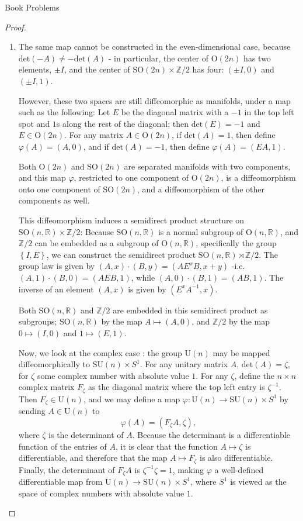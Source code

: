 \documentclass[12pt]{article}
\newcommand{\Z}{\mathbb{Z}}
\newcommand{\R}{\mathbb{R}}
\theoremstyle{definition}
\begin{document}
\begin{section}{Book Problems}
\begin{proof}
\begin{enumerate}[label=(\roman*)]
		\item The same map cannot be constructed in the even-dimensional case, because $\text{det}(-A) \neq -\text{det}(A)$ - in particular, the center of $\text{O}(2n)$ has two elements, $\pm I$, and the center of $\text{SO}(2n) \times \Z/ 2$ has four: $(\pm I, 0)$ and $(\pm I, 1)$. 
			\par However, these two spaces are still diffeomorphic as manifolds, under a map such as the following: Let $E$ be the diagonal matrix with a $-1$ in the top left spot and $1$s along the rest of the diagonal; then $\text{det}(E) = -1$ and $E \in \text{O}(2n)$. For any matrix $A \in \text{O}(2n)$, if $\text{det}(A) = 1$, then define $\varphi(A) = (A, 0)$, and if $\text{det}(A) = -1$, then define $\varphi(A) = (EA, 1)$. 
			\par Both $\text{O}(2n)$ and $\text{SO}(2n)$ are separated manifolds with two components, and this map $\varphi$, restricted to one component of $\text{O}(2n)$, is a diffeomorphism onto one component of $\text{SO}(2n)$, and a diffeomorphism of the other components as well. 
			\par This diffeomorphism induces a semidirect product structure on $\text{SO}(n, \R) \times \Z/2$: Because $\text{SO}(n, \R)$ is a normal subgroup of $\text{O}(n, \R)$, and $\Z/2$ can be embedded as a subgroup of $\text{O}(n, \R)$, specifically the group $\left\{ I, E \right\}$, we can construct the semidirect product $\text{SO}(n,\R) \rtimes \Z/2$. The group law is given by $(A, x) \cdot (B, y) = (AE^xB, x+y)$ -i.e. $(A, 1) \cdot (B, 0) = (AEB, 1)$, while $(A, 0) \cdot (B, 1) = (AB, 1)$. The inverse of an element $(A,x)$ is given by $(E^xA^{-1}, x)$.
				\par Both $\text{SO}(n, \R)$ and $\Z/2$ are embedded in this semidirect product as subgroups; $\text{SO}(n, \R)$ by the map $A \mapsto (A, 0)$, and $\Z/2$ by the map $0 \mapsto (I, 0)$ and $1 \mapsto (E, 1)$.
				\par Now, we look at the complex case : the group $\text{U}(n)$ may be mapped diffeomorphically to $\text{SU}(n) \times S^1$. For any unitary matrix $A$, $\text{det}(A) = \zeta$, for $\zeta$ some complex number with absolute value $1$. For any $\zeta$, define the $n \times n$ complex matrix $F_\zeta$ as the diagonal matrix where the top left entry is $\zeta^{-1}$. Then $F_\zeta \in \text{U}(n)$, and we may define a map $\varphi: \text{U}(n) \to \text{SU}(n) \times S^1$ by sending $A \in \text{U}(n)$ to 
			\[\varphi(A) = (F_\zeta A, \zeta),\]
			where $\zeta$ is the determinant of $A$. Because the determinant is a differentiable function of the entries of $A$, it is clear that the function $A \mapsto \zeta$ is differentiable, and therefore that the map $A \mapsto F_\zeta$ is also differentiable. Finally, the determinant of $F_\zeta A$ is $\zeta^{-1}\zeta = 1$, making $\varphi$ a well-defined differentiable map from $\text{U}(n)\to \text{SU}(n) \times S^1$, where $S^1$ is viewed as the space of complex numbers with absolute value $1$.

\end{enumerate}
\end{proof}
\end{section}
\end{document}
